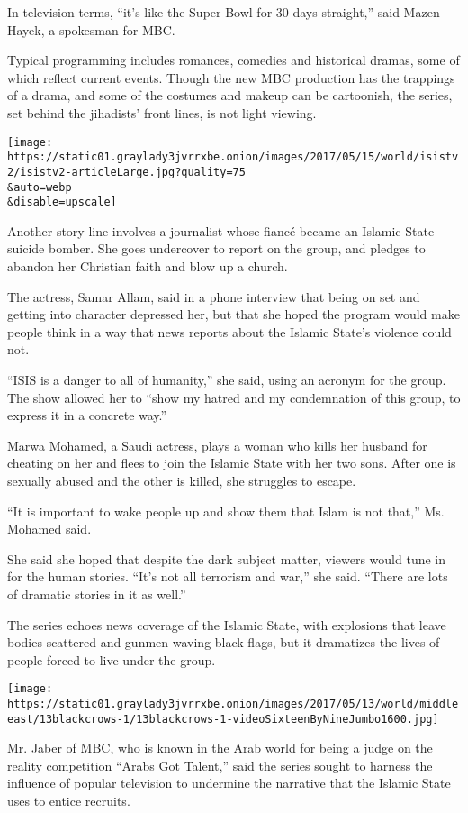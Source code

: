 In television terms, ``it's like the Super Bowl for 30 days straight,''
said Mazen Hayek, a spokesman for MBC.

Typical programming includes romances, comedies and historical dramas,
some of which reflect current events. Though the new MBC production has
the trappings of a drama, and some of the costumes and makeup can be
cartoonish, the series, set behind the jihadists' front lines, is not
light viewing.

\texttt{[image: https://static01.graylady3jvrrxbe.onion/images/2017/05/15/world/isistv2/isistv2-articleLarge.jpg?quality=75\\\&auto=webp\\\&disable=upscale]}

Another story line involves a journalist whose fiancé became an Islamic
State suicide bomber. She goes undercover to report on the group, and
pledges to abandon her Christian faith and blow up a church.

The actress, Samar Allam, said in a phone interview that being on set
and getting into character depressed her, but that she hoped the program
would make people think in a way that news reports about the Islamic
State's violence could not.

``ISIS is a danger to all of humanity,'' she said, using an acronym for
the group. The show allowed her to ``show my hatred and my condemnation
of this group, to express it in a concrete way.''

Marwa Mohamed, a Saudi actress, plays a woman who kills her husband for
cheating on her and flees to join the Islamic State with her two sons.
After one is sexually abused and the other is killed, she struggles to
escape.

``It is important to wake people up and show them that Islam is not
that,'' Ms. Mohamed said.

She said she hoped that despite the dark subject matter, viewers would
tune in for the human stories. ``It's not all terrorism and war,'' she
said. ``There are lots of dramatic stories in it as well.''

The series echoes news coverage of the Islamic State, with explosions
that leave bodies scattered and gunmen waving black flags, but it
dramatizes the lives of people forced to live under the group.

\texttt{[image: https://static01.graylady3jvrrxbe.onion/images/2017/05/13/world/middleeast/13blackcrows-1/13blackcrows-1-videoSixteenByNineJumbo1600.jpg]}

Mr. Jaber of MBC, who is known in the Arab world for being a judge on
the reality competition ``Arabs Got Talent,'' said the series sought to
harness the influence of popular television to undermine the narrative
that the Islamic State uses to entice recruits.

